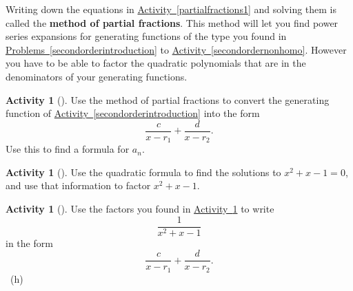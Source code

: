 \documentclass[10pt,]{book}
\newcommand{\terminology}[1]{\textbf{#1}}
\theoremstyle{plain}
\theoremstyle{definition}
\theoremstyle{definition}
\theoremstyle{definition}
\newtheorem{activity}[project]{Activity}
\numberwithin{equation}{chapter}
\begin{document}
\hypertarget{p-1362}{}%
Writing down the equations in \hyperref[partialfractions1]{Activity~\ref{partialfractions1}} and solving them is called the \terminology{method of partial fractions}. This method will let you find power series expansions for generating functions of the type you found in \hyperref[secondorderintroduction]{Problems~\ref{secondorderintroduction}} to \hyperref[secondordernonhomo]{Activity~\ref{secondordernonhomo}}. However you have to be able to factor the quadratic polynomials that are in the denominators of your generating functions.%
\begin{activity}[]\label{activity-259}
\hypertarget{p-1363}{}%
Use the method of partial fractions to convert the generating function of \hyperref[secondorderintroduction]{Activity~\ref{secondorderintroduction}} into the form%
\begin{equation*}
\frac{c}{x-r_1} + \frac{d}{x-r_2}\text{.}
\end{equation*}
Use this to find a formula for \(a_n\).%
\end{activity}
\begin{activity}[]\label{factorFibonacci}
\hypertarget{p-1365}{}%
Use the quadratic formula to find the solutions to \(x^2+x-1=0\), and use that information to factor \(x^2+x-1\).%
\end{activity}
\begin{activity}[]\label{fractionFibonacci}
\hypertarget{p-1367}{}%
Use the factors you found in \hyperref[factorFibonacci]{Activity~\ref{factorFibonacci}} to write%
\begin{equation*}
\frac{1}{x^2+x-1}
\end{equation*}
in the form%
\begin{equation*}
\frac{c}{x-r_1} + \frac{d}{x-r_2}.
\end{equation*}
%
~{\tiny (h)}\end{activity}
\end{document}
